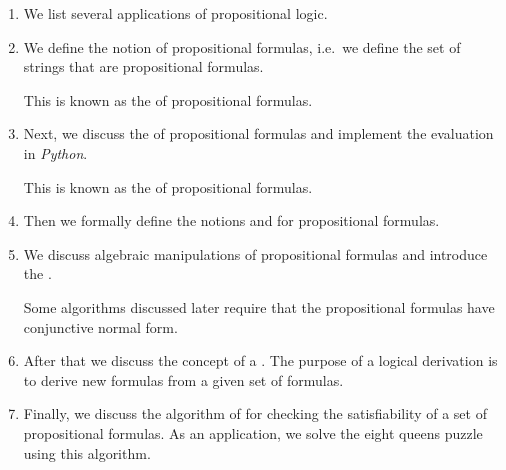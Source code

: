 \begin{enumerate}
\item We list several applications of propositional logic.
\item We define the notion of propositional formulas, i.e.~we define the set of strings that are
      propositional formulas.

      This is known as the  of propositional formulas.
\item Next, we discuss the  of propositional formulas and implement the evaluation in \textsl{Python}.

      This is known as the  of propositional formulas.
\item Then we formally define the notions  and  for propositional formulas.   
\item We discuss algebraic manipulations of propositional formulas and introduce the 
      .

      Some algorithms discussed later require that the propositional formulas have conjunctive normal form.
\item After that we discuss the concept of a .  The purpose of a logical derivation is to
      derive new formulas from a given set of formulas.
\item Finally, we discuss the algorithm of  for checking the satisfiability of a set of
      propositional formulas.  As an application, we solve the eight queens puzzle using this algorithm.
\end{enumerate}


